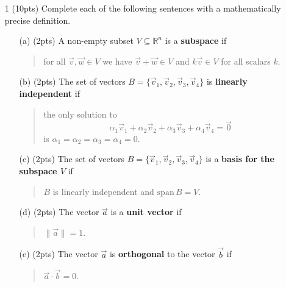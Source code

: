 \documentclass{article}
\newcommand{\R}{\mathbb{R}}
\newcommand{\Span}{\mathrm{span}}
\begin{document}
\begin{enumerate}
	\item[1 (10pts)] Complete each of the following sentences with a mathematically precise definition.
	\begin{enumerate}
		\item[(a) (2pts)] A non-empty subset $V\subseteq \R^n$ is a {\bf subspace} if
			\begin{quote}
				for all $\vec v,\vec w\in V$ we have $\vec v+\vec w\in V$ and $k\vec v\in V$
				for all scalars $k$.
			\end{quote}
		\vspace{1in}
		\item[(b) (2pts)] The set of vectors $B=\{\vec v_1,\vec v_2,\vec v_3,\vec v_4\}$ is {\bf linearly independent} if
			\begin{quote}
				the only solution to 
				\[
					\alpha_1\vec v_1+\alpha_2\vec v_2+\alpha_3\vec v_3+\alpha_4\vec v_4=\vec 0
				\]
				is $\alpha_1=\alpha_2=\alpha_3=\alpha_4=0$.
			\end{quote}
		\vspace{.5in}
		\item[(c) (2pts)] The set of vectors $B=\{\vec v_1,\vec v_2,\vec v_3,\vec v_4\}$ is a {\bf basis for the subspace $V$} if
			\begin{quote}
				$B$ is linearly independent and $\Span\,B=V$.
			\end{quote}
		\vspace{1in}
		\item[(d) (2pts)] The vector $\vec a$ is a {\bf unit vector} if
			\begin{quote}
				$\|\vec a\|=1$.
			\end{quote}
		\vspace{1in}
		\item[(e) (2pts)] The vector $\vec a$ is {\bf orthogonal} to the vector $\vec b$ if
			\begin{quote}
				$\vec a\cdot \vec b=0$.
			\end{quote}
		\vspace{1in}
		
	
		\vspace{5in}
	\end{enumerate}
	\clearpage


\end{enumerate}
\end{document}
